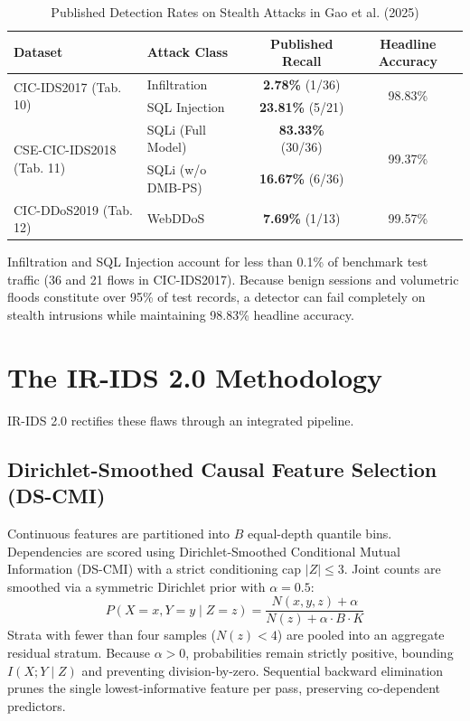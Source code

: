 \documentclass[5p,times,twocolumn]{elsarticle}
\begin{document}
\begin{table}[htbp]
\caption{Published Detection Rates on Stealth Attacks in Gao et al. (2025)}
\label{tab:paper_flaw_recap}
\centering
\begin{tabular}{llcc}
\toprule
\textbf{Dataset} & \textbf{Attack Class} & \textbf{Published Recall} & \textbf{Headline Accuracy} \\
\midrule
\multirow{2}{*}{CIC-IDS2017 (Tab. 10)} & Infiltration & \textbf{2.78\%} (1/36) & \multirow{2}{*}{98.83\%} \\
 & SQL Injection & \textbf{23.81\%} (5/21) & \\
\midrule
\multirow{2}{*}{CSE-CIC-IDS2018 (Tab. 11)} & SQLi (Full Model) & \textbf{83.33\%} (30/36) & \multirow{2}{*}{99.37\%} \\
 & SQLi (w/o DMB-PS) & \textbf{16.67\%} (6/36) & \\
\midrule
CIC-DDoS2019 (Tab. 12) & WebDDoS & \textbf{7.69\%} (1/13) & 99.57\% \\
\bottomrule
\end{tabular}
\end{table}

Infiltration and SQL Injection account for less than 0.1\% of benchmark test traffic (36 and 21 flows in CIC-IDS2017). Because benign sessions and volumetric floods constitute over 95\% of test records, a detector can fail completely on stealth intrusions while maintaining 98.83\% headline accuracy.

\section{The IR-IDS 2.0 Methodology}
IR-IDS 2.0 rectifies these flaws through an integrated pipeline.

\subsection{Dirichlet-Smoothed Causal Feature Selection (DS-CMI)}
Continuous features are partitioned into $B$ equal-depth quantile bins. Dependencies are scored using Dirichlet-Smoothed Conditional Mutual Information (DS-CMI) with a strict conditioning cap $|Z| \le 3$. Joint counts are smoothed via a symmetric Dirichlet prior with $\alpha = 0.5$:
\begin{equation}
P(X = x, Y = y \mid Z = z) = \frac{N(x, y, z) + \alpha}{N(z) + \alpha \cdot B \cdot K}
\end{equation}
Strata with fewer than four samples ($N(z) < 4$) are pooled into an aggregate residual stratum. Because $\alpha > 0$, probabilities remain strictly positive, bounding $I(X; Y \mid Z)$ and preventing division-by-zero. Sequential backward elimination prunes the single lowest-informative feature per pass, preserving co-dependent predictors.
\end{document}
